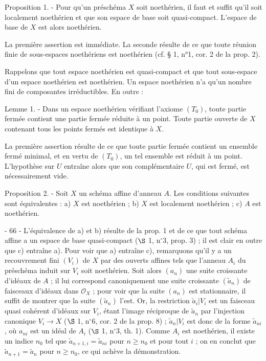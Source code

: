 Proposition 1. - Pour qu'un préschéma $X$ soit noethérien, il faut et suffit qu'il soit localement noethérien et que son espace de base soit quasi-compact. L'espace de base de $X$ est alors noethérien.

La première assertion est immédiate. La seconde résulte de ce que toute réunion finie de sous-espaces noethériens est noethérien (cf. § 1, n°1, cor. 2 de la prop. 2).

Rappelons que tout espace noethérien est quasi-compact et que tout sous-espace d'un espace noethérien est noethérien. Un espace noethérien n'a qu'un nombre fini de composantes irréductibles. En outre :

Lemme 1. - Dans un espace noethérien vérifiant l'axiome $(T_0)$, toute partie fermée contient une partie fermée réduite à un point. Toute partie ouverte de $X$ contenant tous les points fermés est identique à $X$.

La première assertion résulte de ce que toute partie fermée contient un ensemble fermé minimal, et en vertu de $(T_0)$, un tel ensemble est réduit à un point. L'hypothèse sur $U$ entraîne alors que son complémentaire $U$, qui est fermé, est nécessairement vide.

Proposition 2. - Soit $X$ un schéma affine d'anneau $A$. Les conditions suivantes sont équivalentes : a) $X$ est noethérien ; b) $X$ est localement noethérien ; c) $A$ est noethérien.

\newpage


- 66 -
L'équivalence de a) et b) résulte de la prop. 1 et de ce que tout schéma affine a un espace de base quasi-compact ($\S$ 1, n$^\circ$3, prop. 3) ; il est clair en outre que c) entraîne a). Pour voir que a) entraîne c), remarquons qu'il y a un recouvrement fini $(V_i)$ de $X$ par des ouverts affines tels que l'anneau $A_i$ du préschéma induit sur $V_i$ soit noethérien. Soit alors $(a_n)$ une suite croissante d'idéaux de $A$ ; il lui correspond canoniquement une suite croissante $(\tilde{a}_n)$ de faisceaux d'idéaux dans $\mathcal{O}_X$ ; pour voir que la suite $(a_n)$ est stationnaire, il suffit de montrer que la suite $(\tilde{a}_n)$ l'est. Or, la restriction $\tilde{a}_i | V_i$ est un faisceau quasi cohérent d'idéaux sur $V_i$, étant l'image réciproque de $\tilde{a}_n$ par l'injection canonique $V_i \to X$ ($\S$ 1, n$^\circ$6, cor. 2 de la prop. 8) ; $\tilde{a}_n | V_i$ est donc de la forme $\tilde{a}_{ni}$, où $a_{ni}$ est un idéal de $A_i$ ($\S$ 1, n$^\circ$3, th. 1). Comme $A_i$ est noethérien, il existe un indice $n_0$ tel que $\tilde{a}_{n+1, i} = \tilde{a}_{ni}$ pour $n \geqslant n_0$ et pour tout $i$ ; on en conclut que $\tilde{a}_{n+1} = \tilde{a}_n$ pour $n \geqslant n_0$, ce qui achève la démonstration.

